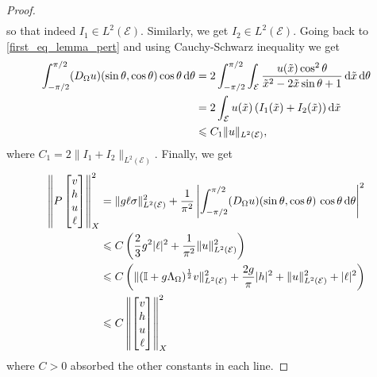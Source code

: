 \documentclass{amsart} %
\numberwithin{equation}{section}
\theoremstyle{definition}
\begin{document}
\begin{proof}
\begin{equation}
\begin{aligned}
\end{aligned}
\end{equation}
so that indeed  $I_1\in L^2(\mathcal{E})$. Similarly, we get $I_2\in L^2(\mathcal{E})$. Going back to \eqref{first_eq_lemma_pert} and using Cauchy-Schwarz inequality we get
\begin{equation}
\begin{aligned}
     \int_{-\pi/2}^{\pi/2}(D_{\Omega}u)(\sin\theta,\cos\theta)\cos\theta\,{\rm d}\theta&= 2\int_{-\pi/2}^{\pi/2} \int_{\mathcal{E}}\frac{u(\tilde x)\cos^2\theta}{\tilde x^2-2\tilde x\sin\theta +1}\,{\rm d}\tilde x\,{\rm d}\theta\\
     &=2\int_{\mathcal{E}}u(\tilde x)\left(I_1(\tilde x)+I_2(\tilde x)\right){\rm d}\tilde x\\
     &\leqslant C_1\|u\|_{L^2(\mathcal{E})},
\end{aligned}
\end{equation}
where $C_1=2\|I_1+I_2\|_{L^2(\mathcal{E})}$.
Finally, we get
\begin{equation}
\begin{aligned}
 \left\|P\begin{bmatrix} v\\h\\u\\ \ell\end{bmatrix}\right\|_X^2&=\|g\ell\sigma\|_{L^2(\mathcal{E})}^2+\frac{1}{\pi^2}\left|\int_{-\pi/2}^{\pi/2}(D_{\Omega}u)(\sin\theta,\cos\theta)\,\cos\theta\,{\rm d}\theta\right|^2\\
 &\leqslant C\left(\frac{2}{3}g^2|\ell|^2+\frac{1}{\pi^2}\|u\|_{L^2(\mathcal{E})}^2\right)\\
 &\leqslant C\left(\|(\mathbb{I}+g\Lambda_\Omega)^{\frac12}v\|_{L^2(\mathcal{E})}^2+\frac{2g}{\pi}|h|^2+\|u\|_{L^2(\mathcal{E})}^2+|\ell|^2\right)\\
 &\leqslant C\left\|\begin{bmatrix}v\\h\\u\\ \ell \end{bmatrix}\right\|_X^2
\end{aligned}
\end{equation}
where $C>0$ absorbed the other constants in each line.
\end{proof}
\end{document}
